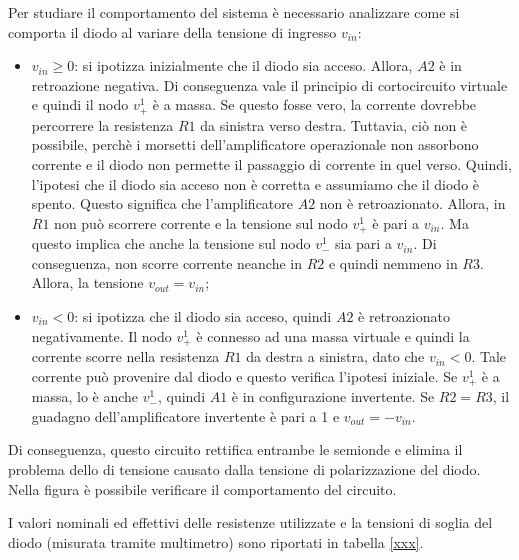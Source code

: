\noindent
Per studiare il comportamento del sistema è necessario analizzare come si comporta il diodo al variare della tensione di ingresso $v_{in}$:
\begin{itemize}
	\item $v_{in} \geq 0$: si ipotizza inizialmente che il diodo sia acceso. Allora, $A2$  è in retroazione negativa. Di conseguenza vale il principio di cortocircuito virtuale e quindi il nodo $v_{+}^1$ è a massa. Se questo fosse vero, la corrente dovrebbe percorrere la resistenza $R1$ da sinistra verso destra. Tuttavia, ciò non è possibile, perchè i morsetti dell'amplificatore operazionale non assorbono corrente e il diodo non permette il passaggio di corrente in quel verso. Quindi, l'ipotesi che il diodo sia acceso non è corretta e assumiamo che il diodo è spento. Questo significa che l'amplificatore $A2$ non è retroazionato. Allora, in $R1$ non può scorrere corrente e la tensione sul nodo $v_{+}^1$ è pari a $v_{in}$. Ma questo implica che anche la tensione sul nodo $v_{-}^1$ sia pari a $v_{in}$. Di conseguenza, non scorre corrente neanche in $R2$ e quindi nemmeno in $R3$. Allora, la tensione $v_{out} = v_{in}$;
	\item $v_{in} < 0$: si ipotizza che il diodo sia acceso, quindi $A2$ è retroazionato negativamente. Il nodo $v_{+}^1$ è connesso ad una massa virtuale e quindi la corrente scorre nella resistenza $R1$ da destra a sinistra, dato che $v_{in} < 0$. Tale corrente può provenire dal diodo e questo verifica l'ipotesi iniziale. Se $v_{+}^1$ è a massa, lo è anche $v_{-}^1$, quindi $A1$ è in configurazione invertente. Se $R2 = R3$, il guadagno dell'amplificatore invertente è pari a 1 e $v_{out} = -v_{in}$.
\end{itemize}
Di conseguenza, questo circuito rettifica entrambe le semionde e elimina il problema dello  di tensione causato dalla tensione di polarizzazione del diodo. Nella figura  è possibile verificare il comportamento del circuito.

I valori nominali ed effettivi delle resistenze utilizzate e la tensioni di soglia del diodo (misurata tramite multimetro) sono riportati in tabella \ref{xxx}.


